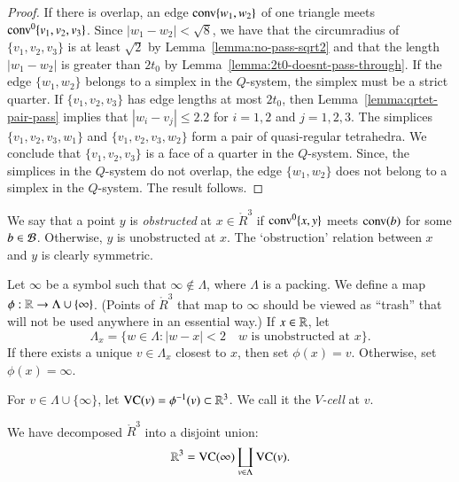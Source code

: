 \begin{proof} If there is overlap, an edge ${\operatorname{conv}}\{w_1,w_2\}$ 
of one triangle meets ${\operatorname{conv}}^0\{v_1,v_2,v_3\}$.  Since
$|w_1-w_2|<\sqrt8$,  we have that the circumradius of
$\{v_1,v_2,v_3\}$ is at least $\sqrt2$ by
Lemma~\ref{lemma:no-pass-sqrt2} and that the length $|w_1-w_2|$ is
greater than $2t_0$ by Lemma~\ref{lemma:2t0-doesnt-pass-through}.
If the edge $\{w_1,w_2\}$ belongs to a simplex in the $Q$-system,
the simplex must be a strict quarter.  If $\{v_1,v_2,v_3\}$ has
edge lengths at most $2t_0$, then
Lemma~\ref{lemma:qrtet-pair-pass} implies that $|w_i-v_j|\le2.2$
for $i=1,2$ and $j=1,2,3$.   The simplices $\{v_1,v_2,v_3,w_1\}$
and $\{v_1,v_2,v_3,w_2\}$ form a pair of quasi-regular tetrahedra.
We conclude that $\{v_1,v_2,v_3\}$ is a face of a quarter in the
$Q$-system. Since, the simplices in the $Q$-system do not overlap,
the edge $\{w_1,w_2\}$ does not belong to a simplex in the
$Q$-system. The result follows.
\end{proof}



\begin{definition} \label{def:obstructed}
We say that a point $y$ is {\it obstructed\/} at $x\in\ring{R}^3$
if ${\operatorname{conv}}^0\{x,y\}$ meets ${\operatorname{conv}}(b)$ for some 
$b\in{\mathcal B}$. Otherwise, $y$ is unobstructed
at $x$.  The `obstruction' relation between $x$ and $y$ is clearly
symmetric.
\end{definition}

\begin{definition}\label{def:trash-phi}
Let $\infty$ be a symbol such that $\infty\not\in\Lambda$,
where $\Lambda$ is a 
packing. We define a map
$\phi:{\mathbb R}\to\Lambda\cup\{\infty\}$.   (Points of $\ring{R}^3$ that
map to $\infty$ should be viewed as ``trash'' that will not be
used anywhere in an essential way.)  If $x\in {\mathbb R}$, let
   $$\Lambda_x = 
   \{w\in\Lambda : |w-x|<2 \quad \text{$w$ is unobstructed at $x$}\}.$$
If there exists a unique $v\in\Lambda_x$ closest to $x$, then set
$\phi(x) = v$. Otherwise, set $\phi(x) = \infty$.
\end{definition}

\begin{definition}\label{def:vcell}
For $v\in\Lambda\cup\{\infty\}$, 
let ${\operatorname{VC}}(v)=\phi^{-1}(v)\subset\mathbb{R}^3$.
We call it the {\it $V$-cell\/} at
$v$.
%
\end{definition}

We have decomposed $\ring{R}^3$ into a disjoint union:
    $$
    \mathbb{R}^3 = {\operatorname{VC}}(\infty)\coprod_{v\in\Lambda}{\operatorname{VC}}(v).
    $$

